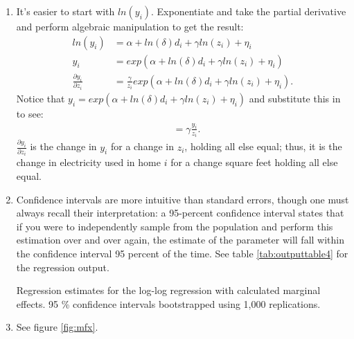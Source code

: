 \documentclass{article}
\begin{document}
\begin{enumerate}[label=(\alph*)]
    \item It's easier to start with $ln(y_i)$. Exponentiate and take the partial derivative and perform algebraic manipulation to get the result:
    \begin{align}
        ln(y_i) &= \alpha + ln(\delta) d_i + \gamma ln(z_i) + \eta_i \\
        y_i &= exp\left( \alpha + ln(\delta) d_i + \gamma ln(z_i) + \eta_i \right) \\
        \frac{\partial y_i}{\partial z_i} &= \frac{\gamma}{z_i} exp\left( \alpha + ln(\delta) d_i + \gamma ln(z_i) + \eta_i \right).
    \end{align}
    Notice that $y_i = exp\left( \alpha + ln(\delta) d_i + \gamma ln(z_i) + \eta_i \right)$ and substitute this in to see:
    \begin{align}
        &= \gamma \frac{y_i}{z_i}.
    \end{align}
    $\frac{\partial y_i}{\partial z_i}$ is the change in $y_i$ for a change in $z_i$, holding all else equal; thus, it is the change in electricity used in home $i$ for a change square feet holding all else equal.
    \item Confidence intervals are more intuitive than standard errors, though one must always recall their interpretation: a 95-percent confidence interval states that if you were to independently sample from the population and perform this estimation over and over again, the estimate of the parameter will fall within the confidence interval 95 percent of the time.  See table \ref{tab:outputtable4} for the regression output.
    \begin{table}[h]
        \centering
        
        \caption{Regression estimates for the log-log regression with calculated marginal effects.  95 \% confidence intervals bootstrapped using 1,000 replications.}
        \label{tab:outputtable4}
    \end{table}
    \item See figure \ref{fig:mfx}.
    \end{enumerate}
\end{document}
